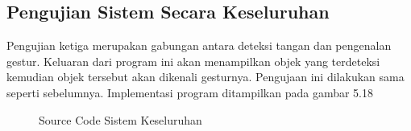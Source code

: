 \subsection{Pengujian Sistem Secara Keseluruhan}
Pengujian ketiga merupakan gabungan antara deteksi tangan dan pengenalan gestur. Keluaran dari program ini akan menampilkan objek yang terdeteksi kemudian objek tersebut akan dikenali gesturnya. Pengujaan ini dilakukan sama seperti sebelumnya. Implementasi program ditampilkan pada gambar 5.18
\begin{figure}[H]
	\centering
	
\end{figure}
\begin{figure}[H]
	\centering
	
\end{figure}
\begin{figure}[H]
	\centering
	
	\caption{Source Code Sistem Keseluruhan}
\end{figure}